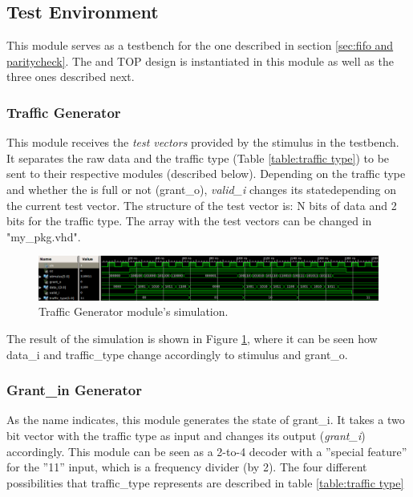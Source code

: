 \documentclass[12pt]{article}
\begin{document}
\subsection{Test Environment}
This module serves as a testbench for the one described in section \ref{sec:fifo and paritycheck}.  The \fifo and \paritycheck TOP design is instantiated in this module as well as the three ones described next.

\subsubsection{Traffic Generator}
\label{subsubsection:Traffic Generator}
This module receives the \textit{test vectors} provided by the stimulus in the testbench. It separates the raw data and the traffic type (Table \ref{table:traffic type}) to be sent to their respective modules (described below). Depending on the traffic type and whether the \fifo is full or not (grant\_o), \textit{valid\_i} changes its statedepending on the current test vector.  The structure of the test vector is: N bits of data and 2 bits for the traffic type.  The array with the test vectors can be changed in "my\_pkg.vhd".

\begin{figure}[ht]
\centering
\includegraphics[width=15cm]{images/traffic-generator-simulation}
\caption{\label{fig:Traffic Generator Simulation}Traffic Generator module's simulation.}
\end{figure}

The result of the simulation is shown in Figure \ref{fig:Traffic Generator Simulation}, where it can be seen how data\_i and traffic\_type change accordingly to stimulus and grant\_o.

\subsubsection{Grant\_in Generator}
As the name indicates, this module generates the state of grant\_i. It takes a two bit vector with the traffic type as input and changes its output (\textit{grant\_i}) accordingly.  This module can be seen as a 2-to-4 decoder with a ''special feature'' for the ''11'' input, which is a frequency divider (by 2).  The four different possibilities that traffic\_type represents are described in table \ref{table:traffic type}
\end{document}
